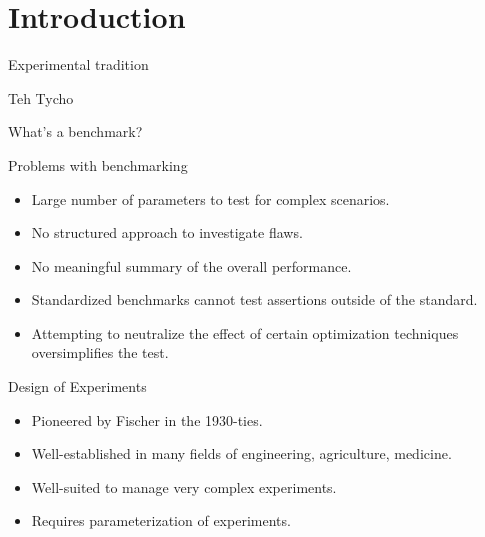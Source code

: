 \documentclass[english,handout,aspectratio=169]{ifislide}
\author{Kjetil Kjernsmo}
\begin{document}
\IfiTitleSlide     %



\section{Introduction} 

\begin{frame}{Experimental tradition}

Teh Tycho

\end{frame}

\begin{frame}{What's a benchmark?}
\end{frame}

\begin{frame}{Problems with benchmarking}

\begin{itemize}
\item Large number of parameters to test for complex scenarios.
\item No structured approach to investigate flaws.
\item No meaningful summary of the overall performance.
\item Standardized benchmarks cannot test assertions outside of the
  standard.
\item Attempting to neutralize the effect of certain optimization
  techniques oversimplifies the test.
\end{itemize}
\end{frame}

\begin{frame}{Design of Experiments}

  \begin{itemize}
  \item Pioneered by Fischer in the 1930-ties.
  \item Well-established in many fields of engineering, agriculture,
    medicine.
  \item Well-suited to manage very complex experiments.
  \item Requires parameterization of experiments.
  \end{itemize}
\end{frame}
\end{document}
